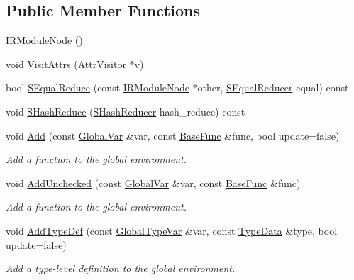 \subsection*{Public Member Functions}
\begin{DoxyCompactItemize}
\item 
\hyperlink{classtvm_1_1IRModuleNode_a12962213bf292b6ebef70804f099eb8a}{I\+R\+Module\+Node} ()
\item 
void \hyperlink{classtvm_1_1IRModuleNode_affbad8fa2513bd33cf8ac7d95aee132e}{Visit\+Attrs} (\hyperlink{classtvm_1_1AttrVisitor}{Attr\+Visitor} $\ast$v)
\item 
bool \hyperlink{classtvm_1_1IRModuleNode_a73931fab441b0a8a8866547e504dbe65}{S\+Equal\+Reduce} (const \hyperlink{classtvm_1_1IRModuleNode}{I\+R\+Module\+Node} $\ast$other, \hyperlink{classtvm_1_1SEqualReducer}{S\+Equal\+Reducer} equal) const 
\item 
void \hyperlink{classtvm_1_1IRModuleNode_a07f7ac491b06aa86c5cc9590a758e408}{S\+Hash\+Reduce} (\hyperlink{classtvm_1_1SHashReducer}{S\+Hash\+Reducer} hash\+\_\+reduce) const 
\item 
void \hyperlink{classtvm_1_1IRModuleNode_ab0ece193de49f17b3de1a75b9739162d}{Add} (const \hyperlink{classtvm_1_1GlobalVar}{Global\+Var} \&var, const \hyperlink{classtvm_1_1BaseFunc}{Base\+Func} \&func, bool update=false)
\begin{DoxyCompactList}\small\item\em Add a function to the global environment. \end{DoxyCompactList}\item 
void \hyperlink{classtvm_1_1IRModuleNode_a46112d512de54bcd5d398a79b03c814a}{Add\+Unchecked} (const \hyperlink{classtvm_1_1GlobalVar}{Global\+Var} \&var, const \hyperlink{classtvm_1_1BaseFunc}{Base\+Func} \&func)
\begin{DoxyCompactList}\small\item\em Add a function to the global environment. \end{DoxyCompactList}\item 
void \hyperlink{classtvm_1_1IRModuleNode_a4284c66981befd976af5deadaca2b7f6}{Add\+Type\+Def} (const \hyperlink{classtvm_1_1GlobalTypeVar}{Global\+Type\+Var} \&var, const \hyperlink{classtvm_1_1TypeData}{Type\+Data} \&type, bool update=false)
\begin{DoxyCompactList}\small\item\em Add a type-\/level definition to the global environment. \end{DoxyCompactList}\item 

\end{DoxyCompactItemize}
